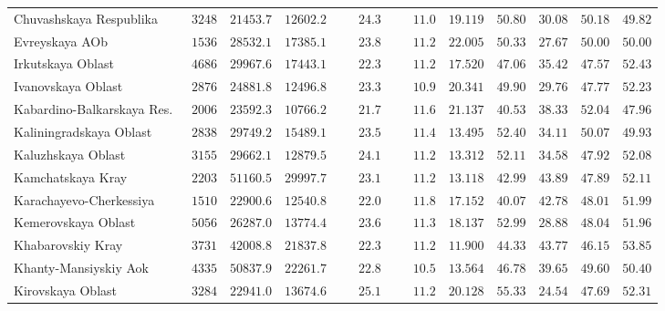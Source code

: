 \documentclass[12pt,a4paper]{article}
\numberwithin{equation}{section}
\begin{document}
{\begin{longtable}{lcccccccccc}
		Chuvashskaya Respublika  & $\phantom{0}3248$ & $21453.7$ & $12602.2$ & $\phantom{000}24.3$ & $\phantom{000}11.0$ & $19.119$ & $50.80$ & $30.08$ & $50.18$ & $49.82$ \\
		Evreyskaya AOb  & $\phantom{0}1536$ & $28532.1$ & $17385.1$ & $\phantom{000}23.8$ & $\phantom{000}11.2$ & $22.005$ & $50.33$ & $27.67$ & $50.00$ & $50.00$ \\
		Irkutskaya Oblast  & $\phantom{0}4686$ & $29967.6$ & $17443.1$ & $\phantom{000}22.3$ & $\phantom{000}11.2$ & $17.520$ & $47.06$ & $35.42$ & $47.57$ & $52.43$ \\
		Ivanovskaya Oblast  & $\phantom{0}2876$ & $24881.8$ & $12496.8$ & $\phantom{000}23.3$ & $\phantom{000}10.9$ & $20.341$ & $49.90$ & $29.76$ & $47.77$ & $52.23$ \\
		Kabardino-Balkarskaya Res.  & $\phantom{0}2006$ & $23592.3$ & $10766.2$ & $\phantom{000}21.7$ & $\phantom{000}11.6$ & $21.137$ & $40.53$ & $38.33$ & $52.04$ & $47.96$ \\
		Kaliningradskaya Oblast  & $\phantom{0}2838$ & $29749.2$ & $15489.1$ & $\phantom{000}23.5$ & $\phantom{000}11.4$ & $13.495$ & $52.40$ & $34.11$ & $50.07$ & $49.93$ \\
		Kaluzhskaya Oblast  & $\phantom{0}3155$ & $29662.1$ & $12879.5$ & $\phantom{000}24.1$ & $\phantom{000}11.2$ & $13.312$ & $52.11$ & $34.58$ & $47.92$ & $52.08$ \\
		Kamchatskaya Kray  & $\phantom{0}2203$ & $51160.5$ & $29997.7$ & $\phantom{000}23.1$ & $\phantom{000}11.2$ & $13.118$ & $42.99$ & $43.89$ & $47.89$ & $52.11$ \\
		Karachayevo-Cherkessiya  & $\phantom{0}1510$ & $22900.6$ & $12540.8$ & $\phantom{000}22.0$ & $\phantom{000}11.8$ & $17.152$ & $40.07$ & $42.78$ & $48.01$ & $51.99$ \\
		Kemerovskaya Oblast  & $\phantom{0}5056$ & $26287.0$ & $13774.4$ & $\phantom{000}23.6$ & $\phantom{000}11.3$ & $18.137$ & $52.99$ & $28.88$ & $48.04$ & $51.96$ \\
		Khabarovskiy Kray  & $\phantom{0}3731$ & $42008.8$ & $21837.8$ & $\phantom{000}22.3$ & $\phantom{000}11.2$ & $11.900$ & $44.33$ & $43.77$ & $46.15$ & $53.85$ \\
		Khanty-Mansiyskiy Aok  & $\phantom{0}4335$ & $50837.9$ & $22261.7$ & $\phantom{000}22.8$ & $\phantom{000}10.5$ & $13.564$ & $46.78$ & $39.65$ & $49.60$ & $50.40$ \\
		Kirovskaya Oblast  & $\phantom{0}3284$ & $22941.0$ & $13674.6$ & $\phantom{000}25.1$ & $\phantom{000}11.2$ & $20.128$ & $55.33$ & $24.54$ & $47.69$ & $52.31$ \\

\end{longtable}}
\end{document}
